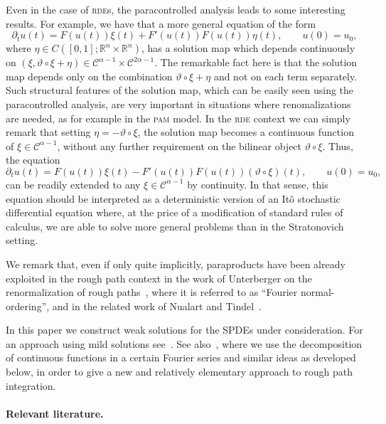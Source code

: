 \documentclass[11pt,a4paper]{article}
\theoremstyle{remark}
\newcommand{\CC}{\ensuremath{\mathscr{C}}}
\begin{document}
Even in the case of \textsc{rde}s, the paracontrolled analysis leads to some interesting results. For example, we have that a more general equation of the form
$$
\partial_t u(t) = F(u(t)) \xi(t) + F'(u(t))F(u(t))\eta(t) ,\qquad
u(0)=u_0,
$$
where $\eta \in C([0,1];\mathbb{R}^n \times \mathbb{R}^n)$,
has a solution map which depends continuously on $(\xi, \vartheta\circ \xi +\eta)\in\CC^{\alpha-1}\times \CC^{2\alpha-1}$. The remarkable fact here is that the solution map depends only on the combination $\vartheta\circ \xi +\eta$ and not on each term separately. Such structural features of the solution map, which can be easily seen using the paracontrolled analysis, are very important in situations where renomalizations are needed, as for example in the \textsc{pam} model. In the \textsc{rde} context we can simply remark that setting $\eta = -\vartheta\circ \xi$, the solution map becomes a continuous function of $\xi \in \CC^{\alpha-1}$, without any further requirement on the bilinear object $\vartheta\circ \xi$. Thus, the equation
$$
\partial_t u(t) = F(u(t)) \xi(t) - F'(u(t))F(u(t))(\vartheta\circ \xi)(t) ,\qquad
u(0)=u_0,
$$
can be readily extended to any $\xi\in\CC^{\alpha-1}$ by continuity. In that sense, this equation should be interpreted as a deterministic version of an It\^o stochastic differential equation where, at the price of a modification of standard rules of calculus, we are able to solve more general problems than in the Stratonovich setting.


\bigskip


We remark that, even if only quite implicitly, paraproducts  have been already exploited in the rough path context in the work of Unterberger on the renormalization of rough paths~\cite{Unterberger2010a, Unterberger2010}, where it is referred to as ``Fourier normal-ordering'', and in the related work of Nualart and Tindel~{\cite{Nualart2011}}.

In this paper we construct weak solutions for the SPDEs under consideration. For an approach using mild solutions see~\cite{Perkowski2013Thesis}. See also~\cite{Gubinelli2013}, where we use the decomposition of continuous functions in a certain Fourier series and similar ideas as developed below, in order to give a new and relatively elementary approach to rough path integration.






\paragraph{Relevant literature.}
\end{document}

